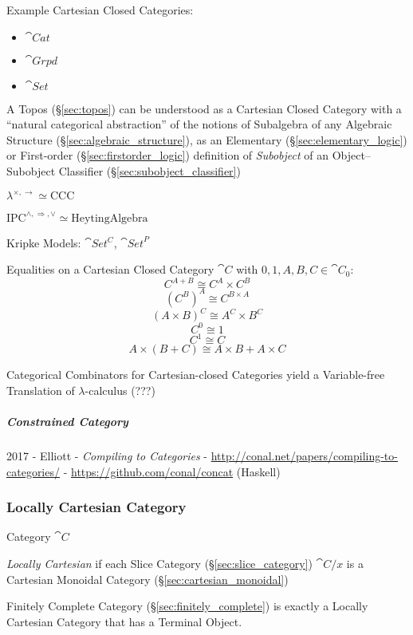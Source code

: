 Example Cartesian Closed Categories:
\begin{itemize}
\item $\cat{Cat}$
\item $\cat{Grpd}$
\item $\cat{Set}$
\end{itemize}

\fist A Topos (\S\ref{sec:topos}) can be understood as a Cartesian Closed
Category with a ``natural categorical abstraction'' of the notions of
Subalgebra of any Algebraic Structure (\S\ref{sec:algebraic_structure}), as an
Elementary (\S\ref{sec:elementary_logic}) or First-order
(\S\ref{sec:firstorder_logic}) definition of \emph{Subobject} of an Object--
Subobject Classifier (\S\ref{sec:subobject_classifier})

$\lambda^{\times, \rightarrow} \simeq \mathrm{CCC}$

$\mathrm{IPC}^{\wedge, \Rightarrow, \vee} \simeq \mathrm{Heyting Algebra}$

Kripke Models: $\cat{Set^C}$, $\cat{Set}^P$ %

Equalities on a Cartesian Closed Category $\cat{C}$ with
$0,1,A,B,C \in \cat{C}_0$:
\[
  C^{A + B} \cong C^A \times C^B
\]\[
  (C^B)^A \cong C^{B \times A}
\]\[
  (A \times B)^C \cong A^C \times B^C
\]\[
  C^0 \cong 1
\]\[
  C^1 \cong C
\]\[
  A \times (B + C) \cong A \times B + A \times C
\]

Categorical Combinators for Cartesian-closed Categories yield a
Variable-free Translation of $\lambda$-calculus (???)



\subparagraph{Constrained Category}\label{sec:constrained_category}\hfill

2017 - Elliott - \emph{Compiling to Categories} -
\url{http://conal.net/papers/compiling-to-categories/} -
\url{https://github.com/conal/concat} (Haskell)



\subsubsection{Locally Cartesian Category}\label{sec:locally_cartesian}

Category $\cat{C}$

\emph{Locally Cartesian} if each Slice Category
(\S\ref{sec:slice_category}) $\cat{C}/x$ is a Cartesian Monoidal
Category (\S\ref{sec:cartesian_monoidal})

Finitely Complete Category (\S\ref{sec:finitely_complete}) is exactly
a Locally Cartesian Category that has a Terminal Object.

